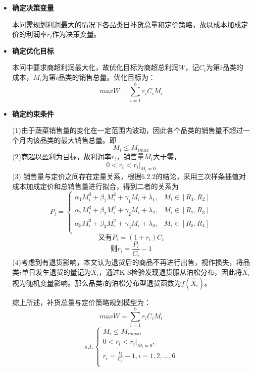 \documentclass{my_paper}
\begin{document}
\begin{itemize}
    \item \textbf{确定决策变量}\par
    本问需规划利润最大的情况下各品类日补货总量和定价策略，故以成本加成定价的利润率$r_i$作为决策变量。
    \item \textbf{确定优化目标}\par
    本问中要求商超利润最大化，故优化目标为商超总利润$W$，记$C_i$为第$i$品类的成本，$M_i$为第$i$品类的销售总量。优化目标为：\\
    \begin{equation}
        maxW=\displaystyle\sum_{i=1}^{6} r_iC_iM_i
    \end{equation}
    \item \textbf{确定约束条件}\par
    (1)由于蔬菜销售量的变化在一定范围内波动，因此各个品类的销售量不超过一个月内该品类的最大销售总量。即
    \begin{equation}
        M_i\leq M_{imax}
    \end{equation}
    (2)商超以盈利为目标，故利润率$r_i$，销售量$M_i$大于零， 
    \begin{equation}
        0< r_i < r_i|_{M_i=0}
    \end{equation}
    (3) 销售量与定价之间存在定量关系，根据6.2.2的结论，采用三次样条插值对成本加成定价和总销售量进行拟合，得到二者的关系为
    \begin{equation}
        P_i=\begin{cases}
            \alpha_1 M_i^3+\beta_1 M_i^2+\gamma_1 M_i+\lambda_1,& M_i\in[R_1,R_2]\\
            \alpha_2 M_i^3+\beta_2 M_i^2+\gamma_2 M_i+\lambda_2,& M_i\in[R_2,R_3]\\
            \alpha_3 M_i^3+\beta_3 M_i^2+\gamma_3 M_i+\lambda_3,& M_i\in[R_3,R_4]\\
        \end{cases}      
    \end{equation}
        $$\text{又有}P_i=(1+r_i)C_i$$
        $$\text{则}r_i=\frac{P_i}{C_i}-1$$
    (4)考虑到有退货影响，本文认为退货后的商品不再进行出售，视作损失，将品类$i$单日发生退货的量记为$\hat{X_i}$，通过K-S检验发现退货服从泊松分布，因此将$\hat{X_i}$视为随机变量影响。那么品类$i$的泊松分布型退货函数为$f(\hat{X_i})$。

    综上所述，补货总量与定价策略规划模型为：
    $$  maxW=\displaystyle\sum_{i=1}^{6} r_iC_iM_i $$
    \begin{equation}      
        s.t.\begin{cases}
             M_i\leq M_{imax},\\
             0< r_i < r_i|_{M_i=0},\\
             r_i=\frac{P_i}{C_i}-1,i=1,2,...,6\\
        \end{cases}
    \end{equation} 
\end{itemize}
\end{document}
